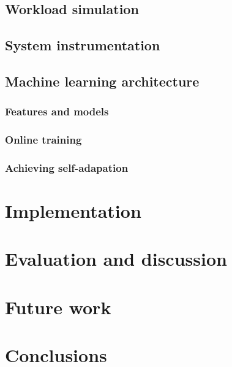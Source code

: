 \subsection{Workload simulation}

\subsection{System instrumentation}

\subsection{Machine learning architecture}

\subsubsection{Features and models}

\subsubsection{Online training}

\subsubsection{Achieving self-adapation}

\section{Implementation}

\section{Evaluation and discussion}

\section{Future work}

\section{Conclusions}


\nocite{*}

\begin{acks}

\end{acks} 